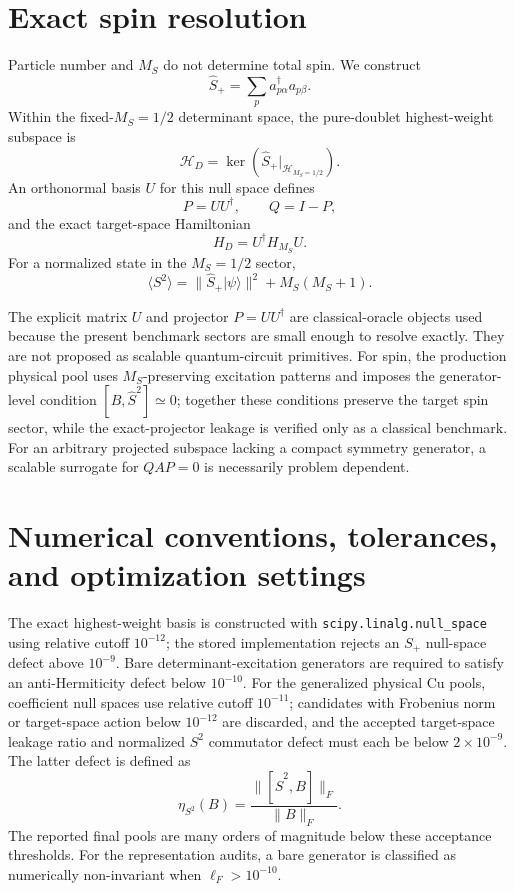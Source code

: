 \documentclass[
 aip,
 jcp,
 amsmath,amssymb,
 preprint
]{revtex4-2}
\begin{document}
\section{Exact spin resolution}

Particle number and $M_S$ do not determine total spin.
We construct
\begin{equation}
\hat S_+=\sum_p a_{p\alpha}^\dagger a_{p\beta}.
\end{equation}
Within the fixed-$M_S=1/2$ determinant space, the pure-doublet highest-weight subspace is
\begin{equation}
\mathcal H_D
=
\ker\!\left(\hat S_+\big|_{\mathcal H_{M_S=1/2}}\right).
\end{equation}
An orthonormal basis $U$ for this null space defines
\begin{equation}
P=UU^\dagger,\qquad Q=I-P,
\end{equation}
and the exact target-space Hamiltonian
\begin{equation}
H_D=U^\dagger H_{M_S}U .
\end{equation}
For a normalized state in the $M_S=1/2$ sector,
\begin{equation}
\langle S^2\rangle
=
\|\hat S_+|\psi\rangle\|^2+M_S(M_S+1).
\end{equation}

The explicit matrix $U$ and projector $P=UU^\dagger$ are classical-oracle objects used because the present benchmark sectors are small enough to resolve exactly.
They are not proposed as scalable quantum-circuit primitives.
For spin, the production physical pool uses $M_S$-preserving excitation patterns and imposes the generator-level condition $[B,\hat S^2]\simeq0$; together these conditions preserve the target spin sector, while the exact-projector leakage is verified only as a classical benchmark.
For an arbitrary projected subspace lacking a compact symmetry generator, a scalable surrogate for $QAP=0$ is necessarily problem dependent.

\section{Numerical conventions, tolerances, and optimization settings}

The exact highest-weight basis is constructed with \texttt{scipy.linalg.null\_space} using relative cutoff $10^{-12}$; the stored implementation rejects an $S_+$ null-space defect above $10^{-9}$.
Bare determinant-excitation generators are required to satisfy an anti-Hermiticity defect below $10^{-10}$.
For the generalized physical Cu pools, coefficient null spaces use relative cutoff $10^{-11}$; candidates with Frobenius norm or target-space action below $10^{-12}$ are discarded, and the accepted target-space leakage ratio and normalized $S^2$ commutator defect must each be below $2\times10^{-9}$.
The latter defect is defined as
\begin{equation}
\eta_{S^2}(B)=\frac{\|[\hat S^2,B]\|_F}{\|B\|_F}.
\end{equation}
The reported final pools are many orders of magnitude below these acceptance thresholds.
For the representation audits, a bare generator is classified as numerically non-invariant when $\ell_F>10^{-10}$.
\end{document}
